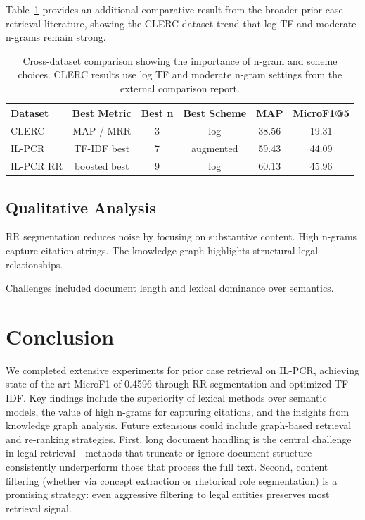 \documentclass[11pt]{article}
\begin{document}
Table~\ref{tab:dataset_comparison} provides an additional comparative result from the broader prior case retrieval literature, showing the CLERC dataset trend that log-TF and moderate n-grams remain strong.

\begin{table}[htbp]
\centering
\footnotesize
\setlength{\tabcolsep}{5pt}
\begin{tabular}{@{}lccccc@{}}
\toprule
\textbf{Dataset} & \textbf{Best Metric} & \textbf{Best n} & \textbf{Best Scheme} & \textbf{MAP} & \textbf{MicroF1@5} \\
\midrule
CLERC & MAP / MRR & 3 & log & 38.56 & 19.31 \\
IL-PCR & TF-IDF best & 7 & augmented & 59.43 & 44.09 \\
IL-PCR RR & boosted best & 9 & log & 60.13 & 45.96 \\
\bottomrule
\end{tabular}
\caption{Cross-dataset comparison showing the importance of n-gram and scheme choices. CLERC results use log TF and moderate n-gram settings from the external comparison report.}
\label{tab:dataset_comparison}
\end{table}

\subsection{Qualitative Analysis}
RR segmentation reduces noise by focusing on substantive content. High n-grams capture citation strings. The knowledge graph highlights structural legal relationships.

Challenges included document length and lexical dominance over semantics.

\section{Conclusion}

We completed extensive experiments for prior case retrieval on IL-PCR, achieving state-of-the-art MicroF1 of 0.4596 through RR segmentation and optimized TF-IDF.
Key findings include the superiority of lexical methods over semantic models, the value of high n-grams for capturing citations, and the insights from knowledge graph analysis.
Future extensions could include graph-based retrieval and re-ranking strategies.
First, long document handling is the central challenge in legal retrieval---methods that truncate or ignore document structure consistently underperform those that process the full text.
Second, content filtering (whether via concept extraction or rhetorical role segmentation) is a promising strategy: even aggressive filtering to legal entities preserves most retrieval signal.
\end{document}
